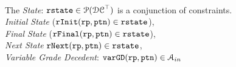 \\
The \emph{State}: 
$\mathtt{rstate} \in \mathcal{P}(\mathcal{DC}^{\top})$ is a conjunction of constraints.
\\
\emph{Initial State} ($\mathtt{rInit}(\mathtt{rp}, \mathtt{ptn}) \in \mathtt{rstate}$), 
\\
\emph{Final State} ($\mathtt{rFinal}(\mathtt{rp}, \mathtt{ptn}) \in \mathtt{rstate}$),
\\
\emph{Next State} $\mathtt{rNext}(\mathtt{rp}, \mathtt{ptn}) \in \mathtt{rstate}$,
\\
\emph{Variable Grade Decedent}: $\mathtt{varGD}(\mathtt{rp}, \mathtt{ptn}) \in \mathcal{A}_{in}$


